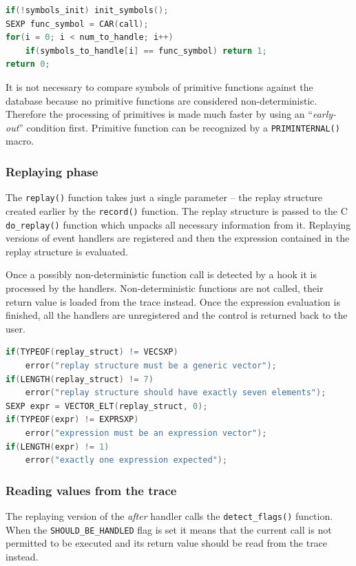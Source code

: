 \documentclass[thesis=M,english,hidelinks]{FITthesis}[2012/10/20]
\newcommand*{\qt}[1]{\enquote{{\itshape#1}}}
\begin{document}
\begin{lstlisting}[style=filestyle, language=C, caption={Detection of presence of a function symbol in the symbol database}]
if(!symbols_init) init_symbols();
SEXP func_symbol = CAR(call);
for(i = 0; i < num_to_handle; i++)
	if(symbols_to_handle[i] == func_symbol) return 1;
return 0;
\end{lstlisting}
			
			It is not necessary to compare symbols of primitive functions against the database because no primitive functions are considered non-deterministic. Therefore the processing of primitives is made much faster by using an \qt{early-out} condition first. Primitive function can be recognized by a \lstinline|PRIMINTERNAL()| macro.\par
			
			\subsubsection{Replaying phase}
			The \lstinline|replay()| function takes just a single parameter -- the replay structure created earlier by the \lstinline|record()| function. The replay structure is passed to the C \lstinline|do_replay()| function which unpacks all necessary information from it. Replaying versions of event handlers are registered and then the expression contained in the replay structure is evaluated.\par
			
			Once a possibly non-deterministic function call is detected by a hook it is processed by the handlers. Non-deterministic functions are not called, their return value is loaded from the trace instead. Once the expression evaluation is finished, all the handlers are unregistered and the control is returned back to the user.\par
			
\begin{lstlisting}[style=filestyle, language=C, caption={Replay structure unpacking example}]
if(TYPEOF(replay_struct) != VECSXP)
	error("replay structure must be a generic vector");
if(LENGTH(replay_struct) != 7)
	error("replay structure should have exactly seven elements");
SEXP expr = VECTOR_ELT(replay_struct, 0);
if(TYPEOF(expr) != EXPRSXP)
	error("expression must be an expression vector");
if(LENGTH(expr) != 1)
	error("exactly one expression expected");
\end{lstlisting}
			
			\subsubsection{Reading values from the trace}
			The replaying version of the \emph{after} handler calls the \lstinline|detect_flags()| function. When the \lstinline|SHOULD_BE_HANDLED| flag is set it means that the current call is not permitted to be executed and its return value should be read from the trace instead.\par
\end{document}
